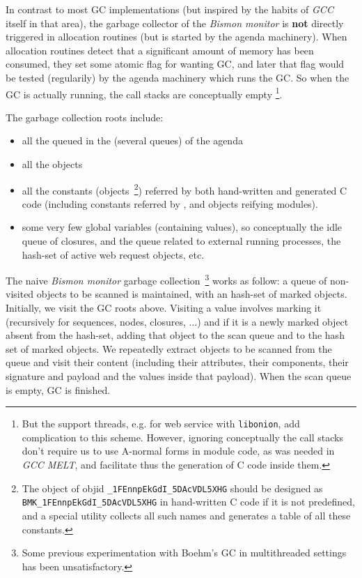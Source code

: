 In contrast to most GC implementations (but inspired by the habits of
\emph{GCC} itself in that area), the garbage collector of the
\emph{Bismon monitor} is \textbf{not} directly triggered in allocation
routines (but is started by the agenda machinery). When allocation
routines detect that a significant amount of memory has been consumed,
they set some atomic flag for wanting GC, and later that flag would be
tested (regularily) by the agenda machinery which runs the GC.  So
when the GC is actually running, the call stacks are conceptually
empty \footnote{But the support threads, e.g. for web service with
  \texttt{libonion}, add complication to this scheme. However,
  ignoring conceptually the call stacks don't require us to use
  A-normal forms in module code, as was needed in \emph{GCC MELT}, and
  facilitate thus the generation of C code inside them.}.

The garbage collection roots include:

\begin{itemize}
\item all the  queued in the (several queues) of the agenda
\item all the  objects
  \item all the constants (objects~\footnote{The object of objid
    \texttt{\_1FEnnpEkGdI\_5DAcVDL5XHG} should be designed as
    \texttt{BMK\_1FEnnpEkGdI\_5DAcVDL5XHG} in hand-written C code if
    it is not predefined, and a special utility collects all such
    names and generates a table of all these constants.}) referred by
    both hand-written and generated C code (including constants
    referred by , and objects reifying
    modules).
\item some very few global variables (containing values), so
  conceptually the idle queue of closures, and the queue related to
  external running processes, the hash-set of active web request
  objects, etc.
\end{itemize}

The naive \emph{Bismon monitor} garbage collection~\footnote{Some
  previous experimentation with Boehm's GC in multithreaded settings
  has been unsatisfactory.}  works as follow: a queue of non-visited
objects to be scanned is maintained, with an hash-set of marked
objects. Initially, we visit the GC roots above. Visiting a value
involves marking it (recursively for sequences, nodes, closures, ...)
and if it is a newly marked object absent from the hash-set, adding
that object to the scan queue and to the hash set of marked
objects. We repeatedly extract objects to be scanned from the queue
and visit their content (including their attributes, their components,
their signature and payload and the values inside that payload). When
the scan queue is empty, GC is finished.
